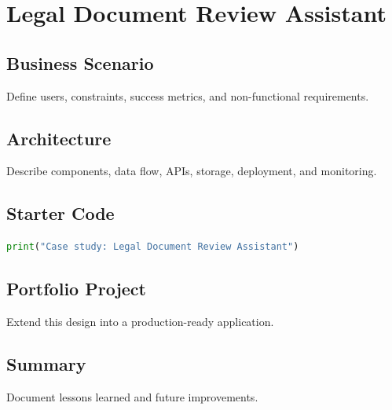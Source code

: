 \chapter{Legal Document Review Assistant}
\label{chap:vol14-6}



\section{Business Scenario}
Define users, constraints, success metrics, and non-functional requirements.

\section{Architecture}
Describe components, data flow, APIs, storage, deployment, and monitoring.

\section{Starter Code}
\begin{lstlisting}[language=Python]
print("Case study: Legal Document Review Assistant")
\end{lstlisting}

\section{Portfolio Project}
Extend this design into a production-ready application.

\section{Summary}
Document lessons learned and future improvements.
